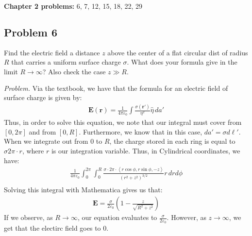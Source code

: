 \documentclass[10pt,oneside]{book}
\newcommand{\gspc}{\vspace{0.13cm}} %
\newcommand{\gline}[0]{\gspc\\} %
\newenvironment{problem}[1]
  {\vspace{-0.1cm}\begin{tcolorbox}[problembox]
   \textit{Problem. }#1}
  {\end{tcolorbox}\gspc}
\newcommand{\cpr}[1]{\left(#1\right)}
\newcommand{\pvec}[1]{\left\langle#1\right\rangle}
\begin{document}
\newcommand{\vE}{{\mathbf{E}}}
\newcommand{\vr}{{\mathbf{r}}}
\newcommand{\etahat}{\hat{\mathbf{\eta}}}
\textbf{Chapter 2 problems:} 6, 7, 12, 15, 18, 22, 29
\subsection*{Problem 6}
Find the electric field a distance $z$ above the center of a flat circular dist of radius $R$ that carries a uniform surface charge $\sigma$. What does your formula give in the limit $R\to\infty$? Also check the case $z\gg R$. 
\begin{problem}
  Via the textbook, we have that the formula for an electric field of surface charge is given by:
  \begin{align*}
    \vE(\vr) = \frac{1}{4\pi \varepsilon_0}\int \frac{\sigma(\vr')}{\eta^2}\hat\eta \,da'
  \end{align*}
  Thus, in order to solve this equation, we note that our integral must cover from $[0,2\pi]$ and from $[0, R]$. Furthermore, we know that in this case, $da' = \sigma d\ell'$.\gline{}
  When we integrate out from 0 to $R$, the charge stored in each ring is equal to $\sigma 2\pi \cdot r$, where $r$ is our integration variable. Thus, in Cylindrical coordinates, we have:
  \begin{align*}
    \frac{1}{4\pi\varepsilon_0}\int_0^{2\pi}\int_0^R \frac{\sigma\cdot 2\pi\cdot \pvec{r\cos\phi, r\sin\phi, -z}}{(r^2 + z^2)^{3/2}}r\, dr d\phi\\
  \end{align*}
  Solving this integral with Mathematica gives us that:
  \begin{align*}
    \vE = \frac{\sigma}{2\varepsilon_0}\cpr{1-\frac{z}{\sqrt{R^2 + z^2}}}
  \end{align*}
  If we observe, as $R\to\infty$, our equation evaluates to $\frac{\sigma}{2\varepsilon_0}$. However, as $z\to\infty$, we get that the electirc field goes to 0. 
\end{problem}
\end{document}
